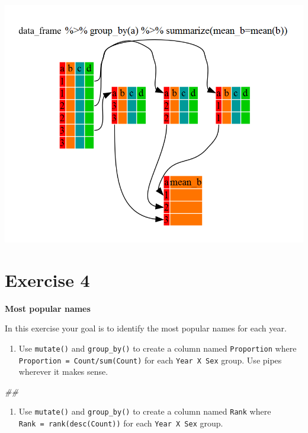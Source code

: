 \documentclass[]{book}
\newenvironment{Shaded}{\begin{snugshade}}{\end{snugshade}}
\newcommand{\CommentTok}[1]{\textcolor[rgb]{0.56,0.35,0.01}{\textit{#1}}}
\providecommand{\tightlist}{%
  \setlength{\itemsep}{0pt}\setlength{\parskip}{0pt}}
\begin{document}
\includegraphics{R/Rintro/images/split-apply-combine.png}

\hypertarget{exercise-4}{%
\section{Exercise 4}\label{exercise-4}}

\textbf{Most popular names}

In this exercise your goal is to identify the most popular names for each year.

\begin{enumerate}
\def\labelenumi{\arabic{enumi}.}
\tightlist
\item
  Use \texttt{mutate()} and \texttt{group\_by()} to create a column named \texttt{Proportion}
  where \texttt{Proportion\ =\ Count/sum(Count)} for each \texttt{Year\ X\ Sex} group.
  Use pipes wherever it makes sense.
\end{enumerate}

\begin{Shaded}
\begin{Highlighting}[]
\CommentTok{## }
\end{Highlighting}
\end{Shaded}

\begin{enumerate}
\def\labelenumi{\arabic{enumi}.}
\setcounter{enumi}{1}
\tightlist
\item
  Use \texttt{mutate()} and \texttt{group\_by()} to create a column named \texttt{Rank} where
  \texttt{Rank\ =\ rank(desc(Count))} for each \texttt{Year\ X\ Sex} group.
\end{enumerate}
\end{document}
